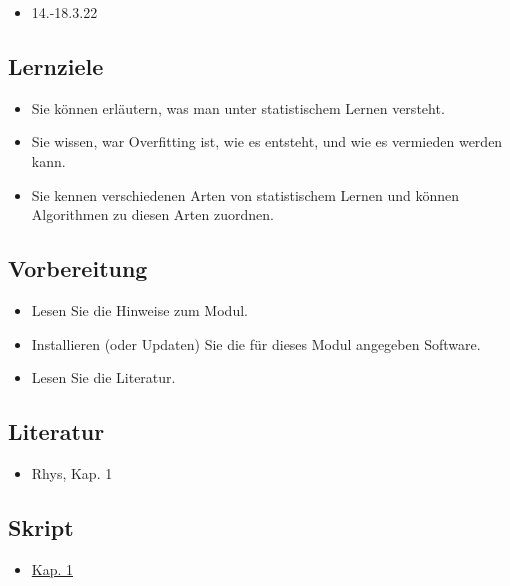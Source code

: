 \documentclass[
]{book}
\providecommand{\tightlist}{%
  \setlength{\itemsep}{0pt}\setlength{\parskip}{0pt}}
\begin{document}
\begin{itemize}
\tightlist
\item
  14.-18.3.22
\end{itemize}

\hypertarget{lernziele-1}{%
\subsection{Lernziele}\label{lernziele-1}}

\begin{itemize}
\tightlist
\item
  Sie können erläutern, was man unter statistischem Lernen versteht.
\item
  Sie wissen, war Overfitting ist, wie es entsteht, und wie es vermieden werden kann.
\item
  Sie kennen verschiedenen Arten von statistischem Lernen und können Algorithmen zu diesen Arten zuordnen.
\end{itemize}

\hypertarget{vorbereitung}{%
\subsection{Vorbereitung}\label{vorbereitung}}

\begin{itemize}
\tightlist
\item
  Lesen Sie die Hinweise zum Modul.
\item
  Installieren (oder Updaten) Sie die für dieses Modul angegeben Software.
\item
  Lesen Sie die Literatur.
\end{itemize}

\hypertarget{literatur-1}{%
\subsection{Literatur}\label{literatur-1}}

\begin{itemize}
\tightlist
\item
  Rhys, Kap. 1
\end{itemize}

\hypertarget{skript}{%
\subsection{Skript}\label{skript}}

\begin{itemize}
\tightlist
\item
  \href{}{Kap. 1}
\end{itemize}
\end{document}
